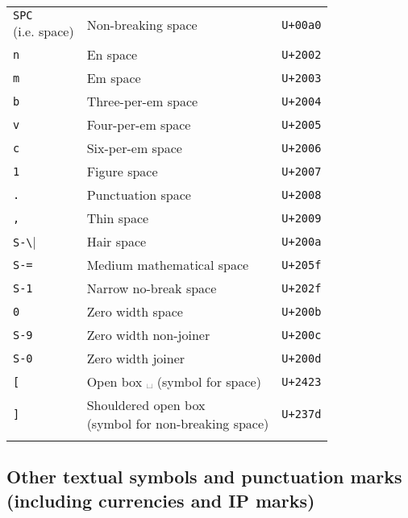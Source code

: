 \documentclass[oneside]{memoir}
\newcommand{\key}{\verb}
\newcommand{\keynv}{\texttt}
\newcommand{\out}[1]{\colorbox{gray!20}{#1}}
\newcommand{\uni}[1]{\texttt{#1}}
\begin{document}
\begin{table}
\begin{minipage}{0.5\paperwidth}
\begin{tabular}{lll}
\makecell{\keynv{SPC}\\(i.e. space)}
                       & Non-breaking space                  & \uni{U+00a0} \\
\key|n|                & En space                            & \uni{U+2002} \\
\key|m|                & Em space                            & \uni{U+2003} \\
\key|b|                & Three-per-em space                  & \uni{U+2004} \\
\key|v|                & Four-per-em space                   & \uni{U+2005} \\
\key|c|                & Six-per-em space                    & \uni{U+2006} \\
\key|1|                & Figure space                        & \uni{U+2007} \\
\key|.|                & Punctuation space                   & \uni{U+2008} \\
\key|,|                & Thin space                          & \uni{U+2009} \\
\key|S-\|              & Hair space                          & \uni{U+200a} \\
\key|S-=|              & Medium mathematical space           & \uni{U+205f} \\
\key|S-1|              & Narrow no-break space               & \uni{U+202f} \\
\key|0|                & Zero width space                    & \uni{U+200b} \\
\key|S-9|              & Zero width non-joiner               & \uni{U+200c} \\
\key|S-0|              & Zero width joiner                   & \uni{U+200d} \\
\key|[|                & Open box \out{␣} (symbol for space) & \uni{U+2423} \\
\key|]|
  & \makecell{Shouldered open box \out{\tfbs{⍽}}\\\quad(symbol for non-breaking space)}
  & \uni{U+237d} \\
\bottomrule&&
\end{tabular}
\end{minipage}
\end{table}

\subsection{Other textual symbols and punctuation marks (including currencies and IP marks)}
\label{sec:symbols_punctuation}
\end{document}
